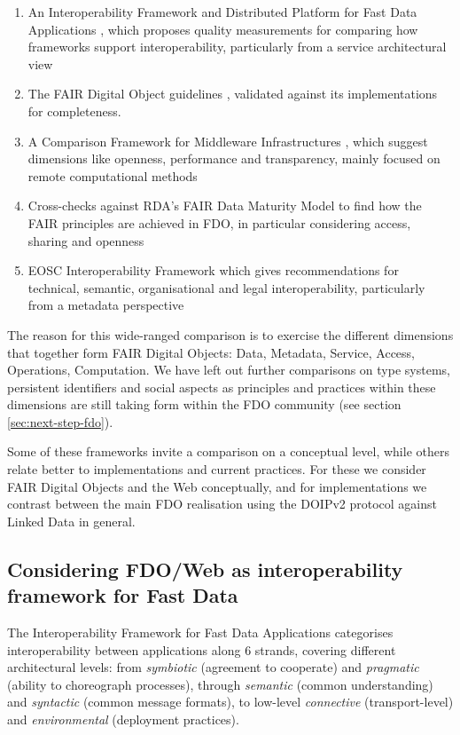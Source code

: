 \documentclass[fleqn,10pt,lineno]{wlpeerj}
\providecommand{\tightlist}{%
  \setlength{\itemsep}{0pt}\setlength{\parskip}{0pt}}
\begin{document}
\begin{enumerate}
\def\labelenumi{\arabic{enumi}.}
\tightlist
\item
  An Interoperability Framework and Distributed Platform for Fast Data Applications \cite{KlCFFFyL}, which proposes quality measurements for comparing how frameworks support interoperability, particularly from a service architectural view
\item
  The FAIR Digital Object guidelines \cite{RwvirqWg}, validated against its implementations for completeness.
\item
  A Comparison Framework for Middleware Infrastructures \cite{hRzcHhPD}, which suggest dimensions like openness, performance and transparency, mainly focused on remote computational methods
\item
  Cross-checks against RDA's FAIR Data Maturity Model \cite{UzQhqk0M} to find how the FAIR principles are achieved in FDO, in particular considering access, sharing and openness
\item
  EOSC Interoperability Framework \cite{aCye3KpE} which gives recommendations for technical, semantic, organisational and legal interoperability, particularly from a metadata perspective
\end{enumerate}

The reason for this wide-ranged comparison is to exercise the different dimensions that together form FAIR Digital Objects: Data, Metadata, Service, Access, Operations, Computation.
We have left out further comparisons on type systems, persistent identifiers and social aspects as principles and practices within these dimensions are still taking form within the FDO community (see section \ref{sec:next-step-fdo}).

Some of these frameworks invite a comparison on a conceptual level, while others relate better to implementations and current practices. For these we consider FAIR Digital Objects and the Web conceptually, and for implementations we contrast between the main FDO realisation using the DOIPv2 protocol \cite{13TcbsZF6} against Linked Data in general.

\hypertarget{sec:interoperability-compare}{%
\subsection*{Considering FDO/Web as interoperability framework for Fast Data}\label{sec:interoperability-compare}}

The Interoperability Framework for Fast Data Applications \cite{KlCFFFyL} categorises interoperability between applications along 6 strands, covering different architectural levels: from \emph{symbiotic} (agreement to cooperate) and \emph{pragmatic} (ability to choreograph processes), through \emph{semantic} (common understanding) and \emph{syntactic} (common message formats), to low-level \emph{connective} (transport-level) and \emph{environmental} (deployment practices).
\end{document}
